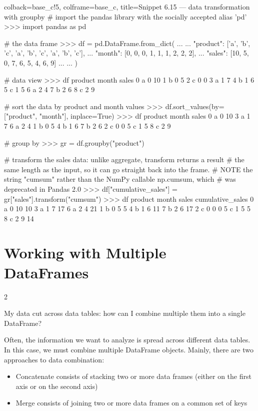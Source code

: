 \documentclass[a4paper,11pt]{book}
\newcommand{\question}[1]{%
    \begin{tcolorbox}[colback=comp_c!10,colframe=comp_c,sidebyside align=top,width=\linewidth,before skip=1ex]
        #1
    \end{tcolorbox}
    \switchcolumn%
}
\newcommand{\note}[1]{%
    \begin{tcolorbox}[colback=white!0,colframe=white!10,width=\linewidth,before skip=1ex]
        #1
    \end{tcolorbox}
}
\begin{document}
\begin{pythoncode}[linenos=True]{colback=base_c!5, colframe=base_c, title=\sffamily Snippet 6.15 --- data transformation with groupby}
# import the pandas library with the socially accepted alias 'pd'
>>> import pandas as pd

# the data frame
>>> df = pd.DataFrame.from_dict(
...     {
...         "product": ['a', 'b', 'c', 'a', 'b', 'c', 'a', 'b', 'c'],
...         "month": [0, 0, 0, 1, 1, 1, 2, 2, 2],
...         "sales": [10,  5,  0,  7,  6,  5,  4,  6,  9]
...     }
...     )

# data view
>>> df
  product  month  sales
0       a      0     10
1       b      0      5
2       c      0      0
3       a      1      7
4       b      1      6
5       c      1      5
6       a      2      4
7       b      2      6
8       c      2      9

# sort the data by product and month values
>>> df.sort_values(by=["product", "month"], inplace=True)
>>> df
  product  month  sales
0       a      0     10
3       a      1      7
6       a      2      4
1       b      0      5
4       b      1      6
7       b      2      6
2       c      0      0
5       c      1      5
8       c      2      9

# group by
>>> gr = df.groupby("product")

# transform the sales data: unlike aggregate, transform returns a result
# the same length as the input, so it can go straight back into the frame.
# NOTE the string "cumsum" rather than the NumPy callable np.cumsum, which
# was deprecated in Pandas 2.0
>>> df["cumulative_sales"] = gr["sales"].transform("cumsum")
>>> df
  product  month  sales  cumulative_sales
0       a      0     10                10
3       a      1      7                17
6       a      2      4                21
1       b      0      5                 5
4       b      1      6                11
7       b      2      6                17
2       c      0      0                 0
5       c      1      5                 5
8       c      2      9                14
\end{pythoncode}

\section{Working with Multiple DataFrames}

\begin{paracol}{2}
	\question{\raggedright My data cut across data tables: how can I combine multiple them into a single DataFrame?}
	\note{Often, the information we want to analyze is spread across different data tables. In this case, we must combine multiple DataFrame objects. Mainly, there are two approaches to data combination:
		\begin{itemize}
			\item Concatenate consists of stacking two or more data frames (either on the first axis or on the second axis)
			\item Merge consists of joining two or more data frames on a common set of keys 
		\end{itemize}
	}
\end{paracol}
\clearpage
\end{document}
